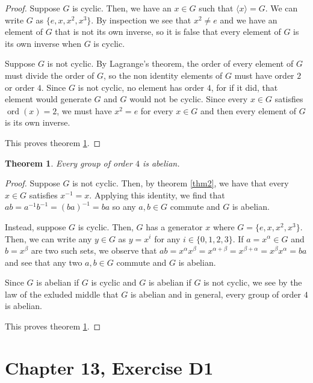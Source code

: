 \documentclass[12pt]{article}
\newcommand{\ord}{\operatorname{ord}}
\newtheorem{thm}{Theorem}
\begin{document}
\begin{proof}
	Suppose $G$ is cyclic.
	Then, we have an $x \in G$
	such that $\langle x \rangle = G$.
	We can write $G$ as $\{e, x, x^2, x^3 \}$.
	By inspection we see that $x^2 \neq e$
	and we have an element of $G$
	that is not its own inverse,
	so it is false that every element of $G$
	is its own inverse when $G$ is cyclic.

	Suppose $G$ is not cyclic.
	By Lagrange's theorem,
	the order of every element of $G$
	must divide the order of $G$,
	so the non identity elements of $G$
	must have order $2$ or order $4$.
	Since $G$ is not cyclic,
	no element has order $4$,
	for if it did,
	that element would generate $G$
	and $G$ would not be cyclic.
	Since every $x \in G$
	satisfies $\ord(x) = 2$,
	we must have $x^2 = e$
	for every $x \in G$
	and then every element of $G$
	is its own inverse.

	This proves theorem \ref{thm3}.
\end{proof}

\begin{thm} \label{thm3}
	Every group of order $4$ is abelian.
\end{thm}

\begin{proof}
	Suppose $G$ is not cyclic.
	Then, by theorem \ref{thm2},
	we have that every $x \in G$
	satisfies $x^{-1} = x$.
	Applying this identity,
	we find that $ab = a^{-1}b^{-1} = (ba)^{-1} = ba$
	so any $a,b \in G$ commute
	and $G$ is abelian.

	Instead, suppose $G$ is cyclic.
	Then, $G$ has a generator $x$
	where $G = \{ e, x, x^2, x^3 \}$.
	Then, we can write any $y \in G$
	as $y = x^i$ for any $i \in \{0, 1, 2, 3 \}$.
	If $a = x^\alpha \in G$ and $b = x^\beta$
	are two such sets,
	we observe that $ab = x^\alpha x^\beta = x^{\alpha + \beta} = x^{\beta + \alpha} =
	x^\beta x^\alpha = ba$
	and see that any two $a,b \in G$
	commute and $G$ is abelian.

	Since $G$ is abelian if $G$ is cyclic
	and $G$ is abelian if $G$ is not cyclic,
	we see by the law of the exluded middle
	that $G$ is abelian and in general,
	every group of order $4$ is abelian.

	This proves theorem \ref{thm3}.
\end{proof}

\section{Chapter 13, Exercise D1}
\end{document}
